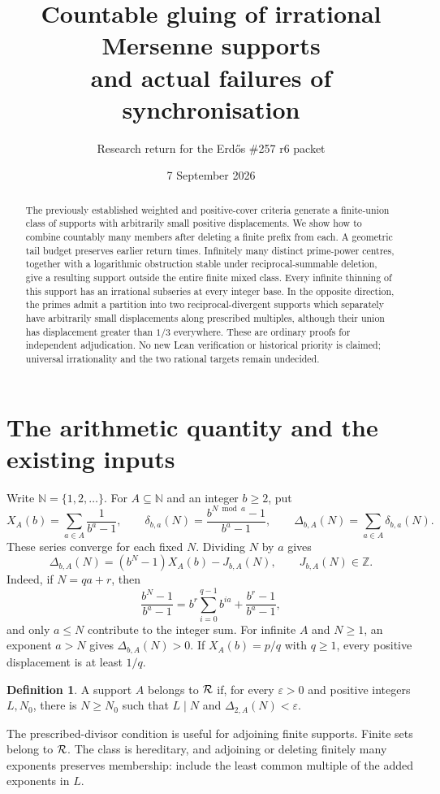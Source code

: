 \documentclass[11pt,a4paper]{article}
\title{Countable gluing of irrational Mersenne supports\\and actual failures of synchronisation}
\author{Research return for the Erd\H{o}s \#257 r6 packet}
\date{7 September 2026}
\theoremstyle{definition}\newtheorem{definition}[theorem]{Definition}
\theoremstyle{remark}\newtheorem{remark}[theorem]{Remark}
\newcommand{\N}{\mathbb N}\newcommand{\Z}{\mathbb Z}\newcommand{\Q}{\mathbb Q}\newcommand{\R}{\mathbb R}
\begin{document}
\maketitle
\begin{abstract}
The previously established weighted and positive-cover criteria generate a finite-union class of supports with arbitrarily small positive displacements. We show how to combine countably many members after deleting a finite prefix from each. A geometric tail budget preserves earlier return times. Infinitely many distinct prime-power centres, together with a logarithmic obstruction stable under reciprocal-summable deletion, give a resulting support outside the entire finite mixed class. Every infinite thinning of this support has an irrational subseries at every integer base. In the opposite direction, the primes admit a partition into two reciprocal-divergent supports which separately have arbitrarily small displacements along prescribed multiples, although their union has displacement greater than $1/3$ everywhere. These are ordinary proofs for independent adjudication. No new Lean verification or historical priority is claimed; universal irrationality and the two rational targets remain undecided.
\end{abstract}

\section{The arithmetic quantity and the existing inputs}
Write $\N=\{1,2,\ldots\}$. For $A\subseteq\N$ and an integer $b\ge2$, put
\[
 X_A(b)=\sum_{a\in A}\frac1{b^a-1},\qquad
 \delta_{b,a}(N)=\frac{b^{N\bmod a}-1}{b^a-1},\qquad
 \Delta_{b,A}(N)=\sum_{a\in A}\delta_{b,a}(N).
\]
These series converge for each fixed $N$. Dividing $N$ by $a$ gives
\begin{equation}\label{eq:lattice}
 \Delta_{b,A}(N)=(b^N-1)X_A(b)-J_{b,A}(N),\qquad J_{b,A}(N)\in\Z.
\end{equation}
Indeed, if $N=qa+r$, then
\[
 \frac{b^N-1}{b^a-1}
 =b^r\sum_{i=0}^{q-1}b^{ia}+\frac{b^r-1}{b^a-1},
\]
and only $a\le N$ contribute to the integer sum. For infinite $A$ and $N\ge1$, an exponent $a>N$ gives $\Delta_{b,A}(N)>0$. If $X_A(b)=p/q$ with $q\ge1$, every positive displacement is at least $1/q$.

\begin{definition}\label{def:return}
A support $A$ belongs to $\mathcal R$ if, for every $\varepsilon>0$ and positive integers $L,N_0$, there is $N\ge N_0$ such that $L\mid N$ and $\Delta_{2,A}(N)<\varepsilon$.
\end{definition}
The prescribed-divisor condition is useful for adjoining finite supports. Finite sets belong to $\mathcal R$. The class is hereditary, and adjoining or deleting finitely many exponents preserves membership: include the least common multiple of the added exponents in $L$.
\end{document}
